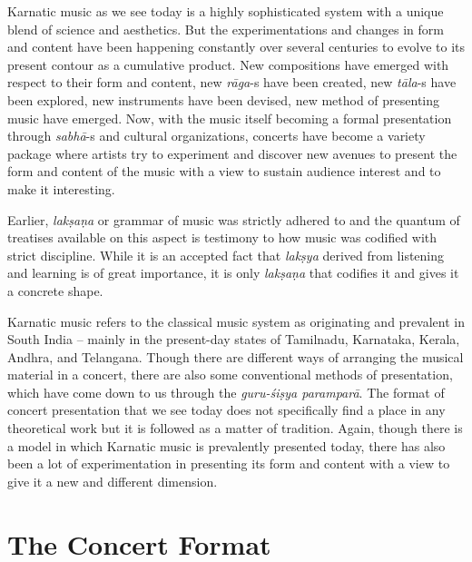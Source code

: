 \vspace{-.3cm}

Karnatic music as we see today is a highly sophisticated system with a unique blend of science and aesthetics. But the experimentations and changes in form and content have been happening constantly over several centuries to evolve to its present contour as a cumulative product. New compositions have emerged with respect to their form and content, new \textit{rāga}-s have been created, new \textit{tāla}-s have been explored, new instruments have been devised, new method of presenting music have emerged. Now, with the music itself becoming a formal presentation through \textit{sabhā}-s and cultural organizations, concerts have become a variety package where artists try to experiment and discover new avenues to present the form and content of the music with a view to sustain audience interest and to make it interesting.

Earlier, \textit{lakṣaṇa} or grammar of music was strictly adhered to and the quantum of treatises available on this aspect is testimony to how music was codified with strict discipline. While it is an accepted fact that \textit{lakṣya} derived from listening and learning is of great importance, it is only \textit{lakṣaṇa} that codifies it and gives it a concrete shape.

Karnatic music refers to the classical music system as originating and prevalent in South India – mainly in the present-day states of Tamilnadu, Karnataka, Kerala, Andhra, and Telangana. Though there are different ways of arranging the musical material in a concert, there are also some conventional methods of presentation, which have come down to us through the \textit{guru-śiṣya paramparā}. The format of concert presentation that we see today does not specifically find a place in any theoretical work but it is followed as a matter of tradition. Again, though there is a model in which Karnatic music is prevalently presented today, there has also been a lot of experimentation in presenting its form and content with a view to give it a new and different dimension.

\vspace{-.4cm}

\section*{The Concert Format}

